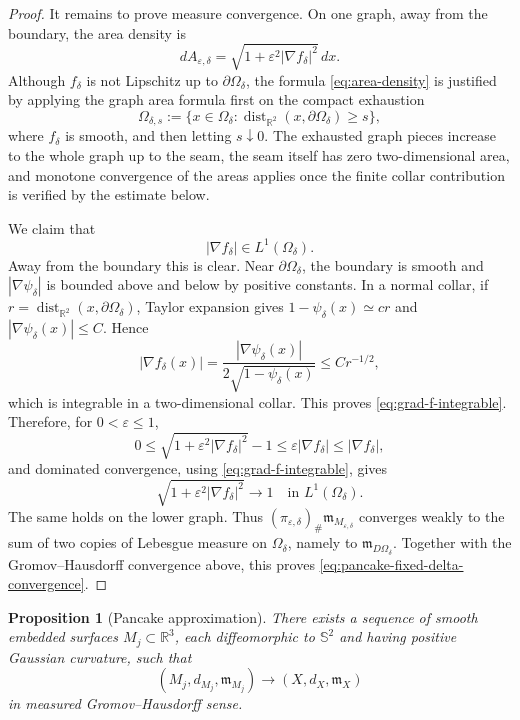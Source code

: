 \documentclass[11pt]{amsart}
\newtheorem{proposition}[theorem]{Proposition}
\numberwithin{equation}{section}
\DeclareMathOperator{\dist}{dist}
\newcommand{\R}{\mathbb R}
\newcommand{\Om}{\Omega}
\newcommand{\eps}{\varepsilon}
\newcommand{\mm}{\mathfrak m}
\begin{document}
\begin{proof}
It remains to prove measure convergence.  On one graph, away from the boundary,
the area density is
\begin{equation}\label{eq:area-density}
dA_{\eps,\delta}=\sqrt{1+\eps^2|\nabla f_\delta|^2}\,dx.
\end{equation}
Although $f_\delta$ is not Lipschitz up to $\partial\Om_\delta$, the formula
\eqref{eq:area-density} is justified by applying the graph area formula first on
the compact exhaustion
$$
\Om_{\delta,s}:=\{x\in\Om_\delta:\dist_{\R^2}(x,\partial\Om_\delta)\ge s\},
$$
where $f_\delta$ is smooth, and then letting $s\downarrow0$.  The exhausted graph
pieces increase to the whole graph up to the seam, the seam itself has zero
two-dimensional area, and monotone convergence of the areas applies once the
finite collar contribution is verified by the estimate below.

We claim that
\begin{equation}\label{eq:grad-f-integrable}
|\nabla f_\delta|\in L^1(\Om_\delta).
\end{equation}
Away from the boundary this is clear.  Near $\partial\Om_\delta$, the boundary is
smooth and $|\nabla\psi_\delta|$ is bounded above and below by positive
constants.  In a normal collar, if $r=\dist_{\R^2}(x,\partial\Om_\delta)$, Taylor
expansion gives $1-\psi_\delta(x)\simeq c r$ and
$|\nabla\psi_\delta(x)|\le C$.  Hence
$$
|\nabla f_\delta(x)|=
\frac{|\nabla\psi_\delta(x)|}{2\sqrt{1-\psi_\delta(x)}}
\le C r^{-1/2},
$$
which is integrable in a two-dimensional collar.  This proves
\eqref{eq:grad-f-integrable}.  Therefore, for $0<\eps\le1$,
$$
0\le \sqrt{1+\eps^2|\nabla f_\delta|^2}-1\le \eps |\nabla f_\delta|
\le |\nabla f_\delta|,
$$
and dominated convergence, using \eqref{eq:grad-f-integrable}, gives
$$
\sqrt{1+\eps^2|\nabla f_\delta|^2}\to1
\quad\text{in }L^1(\Om_\delta).
$$
The same holds on the lower graph.  Thus
$(\pi_{\eps,\delta})_\#\mm_{M_{\eps,\delta}}$ converges weakly to the sum
of two copies of Lebesgue measure on $\Om_\delta$, namely to
$\mm_{D\Om_\delta}$.  Together with the Gromov--Hausdorff convergence above,
this proves \eqref{eq:pancake-fixed-delta-convergence}.
\end{proof}

\begin{proposition}[Pancake approximation]\label{prop:pancake-approx}
There exists a sequence of smooth embedded surfaces $M_j\subset\R^3$, each
diffeomorphic to $\mathbb S^2$ and having positive Gaussian curvature, such that
\begin{equation}\label{eq:pancake-sequence-convergence}
(M_j,d_{M_j},\mm_{M_j})
\longrightarrow
(X,d_X,\mm_X)
\end{equation}
in measured Gromov--Hausdorff sense.
\end{proposition}
\end{document}
